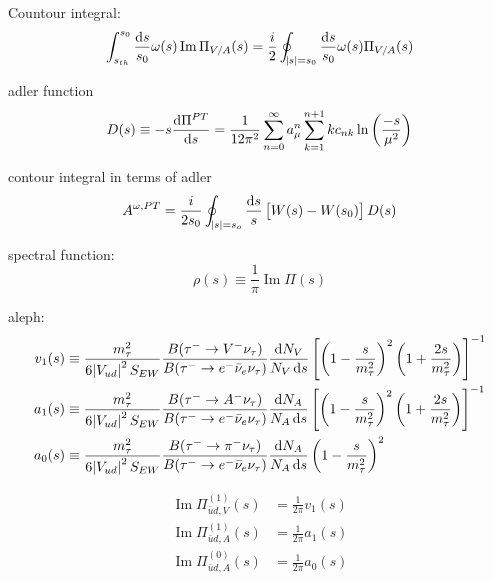 \documentclass{article}
\begin{document}
  Countour integral:
  \begin{equation}
    \int_{s_{th}}^{s_0} \frac{\dif s}{s_0} \omega(s) \operatorname{Im} \Pi_{V/A}(s) = \frac{i}{2} \oint_{\envert{s}=s_0} \frac{\dif s}{s_0} \omega(s) \Pi_{V/A}(s)
  \end{equation}

  adler function
  \begin{equation}
    D(s) \equiv -s \frac{\dif \Pi^{PT}}{\dif s} = \frac{1}{12\pi^2}\sum_{n=0}^\infty a_\mu^n \sum_{k=1}^{n+1} k c_{nk} \ln\left( \frac{-s}{\mu^2} \right)
  \end{equation}

  contour integral in terms of adler
  \begin{equation}
    A^{\omega,PT} = \frac{i}{2 s_0} \oint_{\envert{s}=s_o} \frac{\dif s}{s} \left[ W(s) - W(s_0) \right] D(s)
  \end{equation}

  spectral function:
  \begin{equation}
    \rho(s) \equiv \frac{1}{\pi} \operatorname{Im}\Pi(s)
  \end{equation}
  
  aleph:
  \begin{equation}
    \begin{split}
      v_1(s) &\equiv \frac{m_\tau^2}{6 \envert{V_{ud}}^2S_{EW}} \frac{B(\tau^- \to V^- \nu_\tau)}{B(\tau^- \to e^- \bar \nu_e \nu_\tau)} \frac{\dif N_V}{N_V \dif s} \left[ \left( 1 - \frac{s}{m_\tau^2} \right)^2 \left( 1 + \frac{2 s}{m_\tau^2}\right) \right]^{-1} \\
      a_1(s) &\equiv \frac{m_\tau^2}{6 \envert{V_{ud}}^2S_{EW}} \frac{B(\tau^- \to A^- \nu_\tau)}{B(\tau^- \to e^- \bar \nu_e \nu_\tau)} \frac{\dif N_A}{N_A \dif s} \left[ \left( 1 - \frac{s}{m_\tau^2} \right)^2 \left( 1 + \frac{2 s}{m_\tau^2}\right) \right]^{-1} \\
      a_0(s) &\equiv \frac{m_\tau^2}{6 \envert{V_{ud}}^2S_{EW}} \frac{B(\tau^- \to \pi^- \nu_\tau)}{B(\tau^- \to e^- \bar \nu_e \nu_\tau)} \frac{\dif N_A}{N_A \dif s} \left( 1 - \frac{s}{m_\tau^2} \right)^2
    \end{split}
  \end{equation} 

  \begin{equation}
    \begin{split}
      \operatorname{Im} \Pi_{\bar u d,V}^{(1)}(s) &= \frac{1}{2\pi} v_1(s) \\
      \operatorname{Im} \Pi_{\bar u d,A}^{(1)}(s) &= \frac{1}{2\pi} a_1(s) \\
      \operatorname{Im} \Pi_{\bar u d,A}^{(0)}(s) &= \frac{1}{2\pi} a_0(s)
    \end{split}
  \end{equation}
\end{document}
